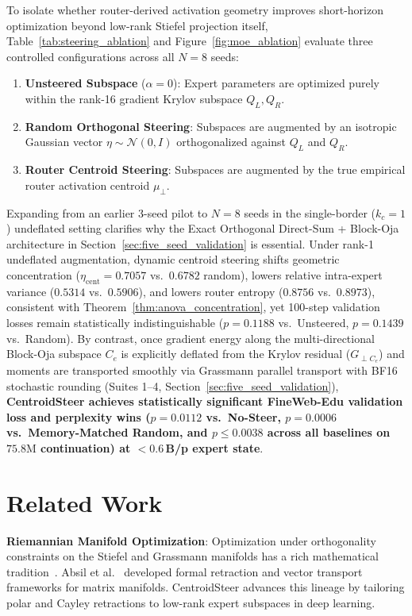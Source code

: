 \documentclass[10pt,twocolumn,letterpaper]{article}
\begin{document}
To isolate whether router-derived activation geometry improves short-horizon optimization beyond low-rank Stiefel projection itself, Table~\ref{tab:steering_ablation} and Figure~\ref{fig:moe_ablation} evaluate three controlled configurations across all $N=8$ seeds:
\begin{enumerate}
    \item \textbf{Unsteered Subspace} ($\alpha=0$): Expert parameters are optimized purely within the rank-16 gradient Krylov subspace $Q_L, Q_R$.
    \item \textbf{Random Orthogonal Steering}: Subspaces are augmented by an isotropic Gaussian vector $\eta \sim \mathcal{N}(0, I)$ orthogonalized against $Q_L$ and $Q_R$.
    \item \textbf{Router Centroid Steering}: Subspaces are augmented by the true empirical router activation centroid $\mu_\perp$.
\end{enumerate}

Expanding from an earlier 3-seed pilot to $N=8$ seeds in the single-border ($k_c=1$) undeflated setting clarifies why the Exact Orthogonal Direct-Sum + Block-Oja architecture in Section~\ref{sec:five_seed_validation} is essential. Under rank-1 undeflated augmentation, dynamic centroid steering shifts geometric concentration ($\eta_{\text{cent}} = 0.7057$ vs.\ $0.6782$ random), lowers relative intra-expert variance ($0.5314$ vs.\ $0.5906$), and lowers router entropy ($0.8756$ vs.\ $0.8973$), consistent with Theorem~\ref{thm:anova_concentration}, yet 100-step validation losses remain statistically indistinguishable ($p=0.1188$ vs.\ Unsteered, $p=0.1439$ vs.\ Random). By contrast, once gradient energy along the multi-directional Block-Oja subspace $C_e$ is explicitly deflated from the Krylov residual ($G_{\perp C_e}$) and moments are transported smoothly via Grassmann parallel transport with BF16 stochastic rounding (Suites 1--4, Section~\ref{sec:five_seed_validation}), \textbf{CentroidSteer achieves statistically significant FineWeb-Edu validation loss and perplexity wins ($p=0.0112$ vs.\ No-Steer, $p=0.0006$ vs.\ Memory-Matched Random, and $p \le 0.0038$ across all baselines on $75.8\text{M}$ continuation) at $<0.6$\,B/p expert state}.

\section{Related Work}

\textbf{Riemannian Manifold Optimization}: Optimization under orthogonality constraints on the Stiefel and Grassmann manifolds has a rich mathematical tradition~\cite{edelman1998geometry,absil2008optimization}. Absil et al.~\cite{absil2008optimization} developed formal retraction and vector transport frameworks for matrix manifolds. CentroidSteer advances this lineage by tailoring polar and Cayley retractions to low-rank expert subspaces in deep learning.
\end{document}
